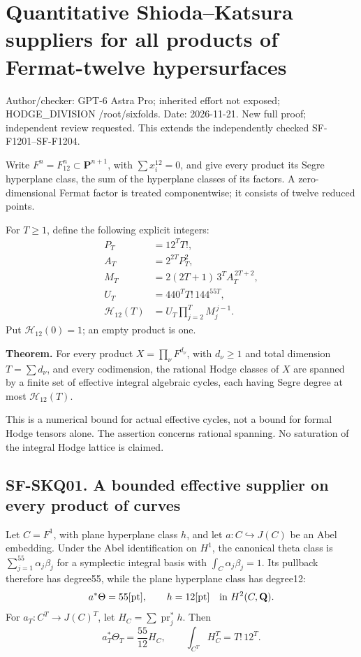 \section{Quantitative Shioda--Katsura suppliers for all products of
Fermat-twelve
hypersurfaces}\label{quantitative-shiodakatsura-suppliers-for-all-products-of-fermat-twelve-hypersurfaces}

Author/checker: GPT-6 Astra Pro; inherited effort not exposed;
HODGE\_DIVISION /root/sixfolds. Date: 2026-11-21. New full proof;
independent review requested. This extends the independently checked
SF-F1201--SF-F1204.

Write \(F^n=F_{12}^n\subset\mathbf P^{n+1}\), with \(\sum x_i^{12}=0\),
and give every product its Segre hyperplane class, the sum of the
hyperplane classes of its factors. A zero-dimensional Fermat factor is
treated componentwise; it consists of twelve reduced points.

For \(T\ge1\), define the following explicit integers: \[
 \begin{aligned}
 P_T&=12^T T!,\\
 A_T&=2^{2T}P_T^2,\\
 M_T&=2(2T+1)\,3^T A_T^{\,2T+2},\\
 U_T&=440^T T!\,144^{55T},\\
 \mathcal H_{12}(T)&=
 U_T\prod_{j=2}^{T}M_j^{\,j-1}.
 \end{aligned}
 \tag{SKQ.1}
\] Put \(\mathcal H_{12}(0)=1\); an empty product is one.

\textbf{Theorem.} For every product \(X=\prod_\nu F^{d_\nu}\), with
\(d_\nu\ge1\) and total dimension \(T=\sum d_\nu\), and every
codimension, the rational Hodge classes of \(X\) are spanned by a finite
set of effective integral algebraic cycles, each having Segre degree at
most \(\mathcal H_{12}(T)\).

This is a numerical bound for actual effective cycles, not a bound for
formal Hodge tensors alone. The assertion concerns rational spanning. No
saturation of the integral Hodge lattice is claimed.

\subsection{SF-SKQ01. A bounded effective supplier on every product of
curves}\label{SF-SKQ01}

Let \(C=F^1\), with plane hyperplane class \(h\), and let
\(a:C\hookrightarrow J(C)\) be an Abel embedding. Under the Abel
identification on \(H^1\), the canonical theta class is
\(\sum_{j=1}^{55}\alpha_j\beta_j\) for a symplectic integral basis with
\(\int_C\alpha_j\beta_j=1\). Its pullback therefore has degree55, while
the plane hyperplane class has degree12: \[
 a^*\Theta=55[\mathrm{pt}],\qquad h=12[\mathrm{pt}]
 \quad\hbox{in }H^2(C,\mathbf Q).
\] For \(a_T:C^T\to J(C)^T\), let \(H_C=\sum\operatorname{pr}_j^*h\).
Then \[
 a_T^*\Theta_T=\frac{55}{12}H_C,\qquad
 \int_{C^T}H_C^T=T!\,12^T.
 \tag{SKQ.2}
\]


